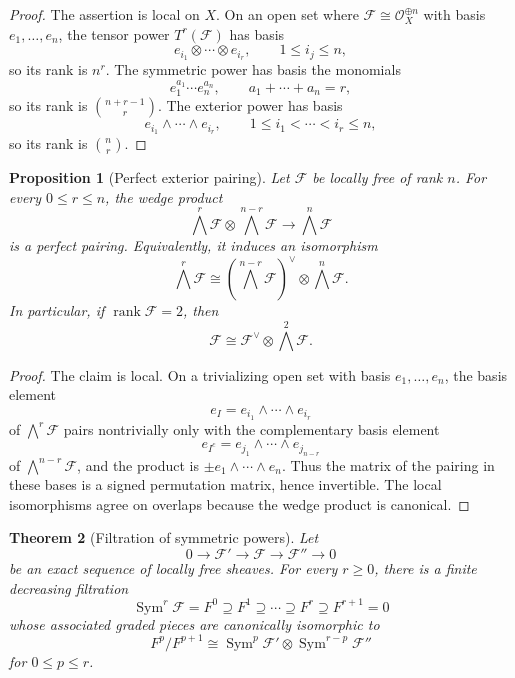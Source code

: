 \documentclass[11pt]{amsart}
\DeclareMathOperator{\Sym}{Sym}
\DeclareMathOperator{\rank}{rank}
\newcommand{\OO}{\mathcal O}
\newcommand{\F}{\mathscr F}
\newcommand{\dual}{\vee}
\theoremstyle{plain}
\newtheorem{theorem}{Theorem}[section]
\newtheorem{proposition}[theorem]{Proposition}
\theoremstyle{definition}
\theoremstyle{remark}
\begin{document}
\begin{proof}
The assertion is local on $X$.  On an open set where $\F\cong \OO_X^{\oplus n}$ with basis $e_1,\ldots,e_n$, the tensor power $T^r(\F)$ has basis
\[
  e_{i_1}\otimes\cdots\otimes e_{i_r},\qquad 1\leq i_j\leq n,
\]
so its rank is $n^r$.  The symmetric power has basis the monomials
\[
  e_1^{a_1}\cdots e_n^{a_n},\qquad a_1+\cdots+a_n=r,
\]
so its rank is $\binom{n+r-1}{r}$.  The exterior power has basis
\[
  e_{i_1}\wedge\cdots\wedge e_{i_r},\qquad 1\leq i_1<\cdots<i_r\leq n,
\]
so its rank is $\binom nr$.
\end{proof}

\begin{proposition}[Perfect exterior pairing]\label{prop:exterior-perfect-pairing}
Let $\F$ be locally free of rank $n$.  For every $0\leq r\leq n$, the wedge product
\[
  \bigwedge^r\F \otimes \bigwedge^{n-r}\F
  \longrightarrow
  \bigwedge^n\F
\]
is a perfect pairing.  Equivalently, it induces an isomorphism
\[
  \bigwedge^r\F
  \cong
  \left(\bigwedge^{n-r}\F\right)^\dual\otimes \bigwedge^n\F.
\]
In particular, if $\rank \F=2$, then
\[
  \F \cong \F^\dual\otimes \bigwedge^2\F.
\]
\end{proposition}

\begin{proof}
The claim is local.  On a trivializing open set with basis $e_1,\ldots,e_n$, the basis element
\[
  e_I=e_{i_1}\wedge\cdots\wedge e_{i_r}
\]
of $\bigwedge^r\F$ pairs nontrivially only with the complementary basis element
\[
  e_{I^c}=e_{j_1}\wedge\cdots\wedge e_{j_{n-r}}
\]
of $\bigwedge^{n-r}\F$, and the product is $\pm e_1\wedge\cdots\wedge e_n$.  Thus the matrix of the pairing in these bases is a signed permutation matrix, hence invertible.  The local isomorphisms agree on overlaps because the wedge product is canonical.
\end{proof}

\begin{theorem}[Filtration of symmetric powers]\label{thm:symmetric-filtration}
Let
\[
  0\longrightarrow \F'\longrightarrow \F\longrightarrow \F''\longrightarrow 0
\]
be an exact sequence of locally free sheaves.  For every $r\geq 0$, there is a finite decreasing filtration
\[
  \Sym^r\F = F^0 \supseteq F^1 \supseteq \cdots \supseteq F^{r}\supseteq F^{r+1}=0
\]
whose associated graded pieces are canonically isomorphic to
\[
  F^p/F^{p+1}
  \cong
  \Sym^p\F'\otimes \Sym^{r-p}\F''
\]
for $0\leq p\leq r$.
\end{theorem}
\end{document}

